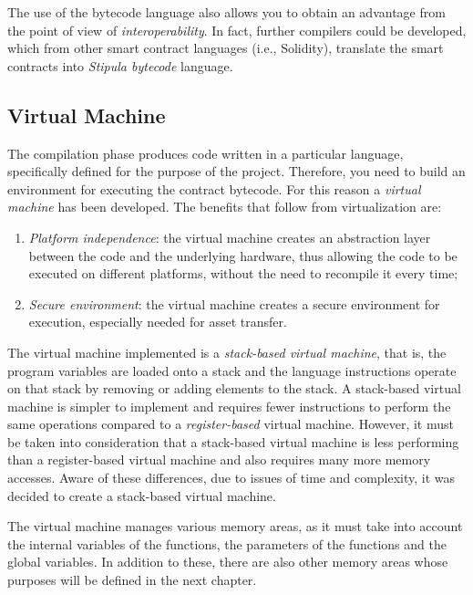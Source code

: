 The use of the bytecode language also allows you to obtain an advantage from the point of view of 
\textit{interoperability}. In fact, further compilers could be developed, which from other smart contract 
languages (i.e., Solidity), translate the smart contracts into \textit{Stipula bytecode} language.

\subsection{Virtual Machine}

The compilation phase produces code written in a particular language, specifically defined for the purpose 
of the project. Therefore, you need to build an environment for executing the contract bytecode. For this 
reason a \textit{virtual machine} has been developed. The benefits that follow from virtualization are:
\begin{enumerate}
	\item \textit{Platform independence}: the virtual machine creates an abstraction layer between the code 
	and the underlying hardware, thus allowing the code to be executed on different platforms, without the 
	need to recompile it every time;
	\item \textit{Secure environment}: the virtual machine creates a secure environment for execution, 
	especially needed for asset transfer.
\end{enumerate}

\label{stack-based-vm}
The virtual machine implemented is a \textit{stack-based virtual machine}, that is, the program variables 
are loaded onto a stack and the language instructions operate on that stack by removing or adding elements 
to the stack. A stack-based virtual machine is simpler to implement and requires fewer instructions to 
perform the same operations compared to a \textit{register-based} virtual machine. However, it must be 
taken into consideration that a stack-based virtual machine is less performing than a register-based 
virtual machine and also requires many more memory accesses. Aware of these differences, due to issues of 
time and complexity, it was decided to create a stack-based virtual machine.

The virtual machine manages various memory areas, as it must take into account the internal variables of 
the functions, the parameters of the functions and the global variables. In addition to these, there are 
also other memory areas whose purposes will be defined in the next chapter.


